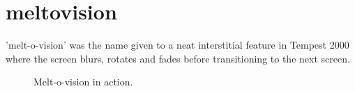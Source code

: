 \chapter{meltovision}
\label{sec:meltovision}
\lstset{style=68KStyle}
\lhead[tempest 2000]{}
'melt-o-vision' was the name given to a neat interstitial feature in Tempest 2000 where
the screen blurs, rotates and fades before transitioning to the next screen.

\begin{figure}[H]
    \centering
    \centerline{%
    \hspace{0.2cm}
    }%
    \vspace{0.2cm}
    \centerline{%
    \hspace{0.2cm}
    }%
  \caption{Melt-o-vision in action.}
\end{figure}

